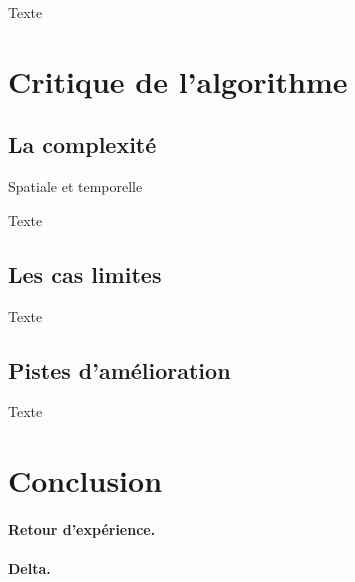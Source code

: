 \documentclass[12pt]{article}
\begin{document}
Texte



\newpage
\section{Critique de l'algorithme}


\subsection{La complexité}

Spatiale et temporelle

Texte

\subsection{Les cas limites}

Texte


\subsection{Pistes d'amélioration}

Texte




\newpage
\section*{Conclusion}
\label{sec:conclu}

\paragraph{Retour d'expérience.} 

\paragraph{Delta.} 
\end{document}

